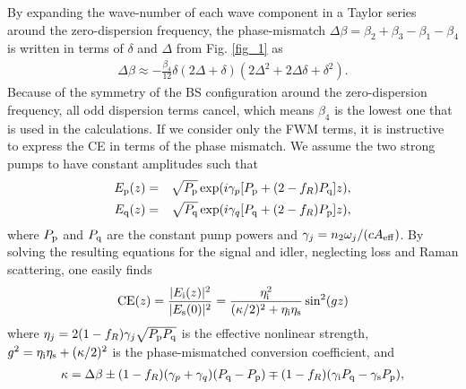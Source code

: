 \documentclass[10pt,letterpaper]{article}
\begin{document}
By expanding the wave-number of each wave component in a Taylor series around the zero-dispersion frequency, the phase-mismatch $\Delta \beta = \beta_2 + \beta_3 - \beta_1 - \beta_4$ is written in terms of $\delta$ and $\Delta$ from Fig. \ref{fig_1} as
\begin{eqnarray} \label{eq_22}
\Delta \beta \approx -\frac{\beta_4}{12}\delta (2\Delta + \delta)\left( 2\Delta^2+2\Delta \delta + \delta^2 \right).
\end{eqnarray}
Because of the symmetry of the BS configuration around the zero-dispersion frequency, all odd dispersion terms cancel, which means $\beta_4$ is the lowest one that is used in the calculations. If we consider only the FWM terms, it is instructive to express the CE in terms of the phase mismatch. We assume the two strong pumps to have constant amplitudes such that
\begin{eqnarray}\label{eq_3}
E_{\rm p}(z) &=& \sqrt{P_{\rm p}}\exp(i\gamma_p[P_{\rm p} + (2-f_R)P_{\rm q}]z),\\
E_{\rm q}(z) &=& \sqrt{P_{\rm q}}\exp(i\gamma_q[P_{\rm q} + (2-f_R)P_{\rm p}]z), \label{eq_4}
\end{eqnarray}
where $P_{\rm p}$ and $P_{\rm q}$ are the constant pump powers and $\gamma_j = n_2 \omega_j/(cA_{\rm eff})$. By solving the resulting equations for the signal and idler, neglecting loss and Raman scattering, one easily finds
\begin{eqnarray} \label{eq_23}
{\rm CE}(z) = \frac{|E_{\rm i}(z)|^2}{|E_{\rm s}(0)|^2} =  \frac{\eta_{\rm i}^2}{(\kappa/2)^2 + \eta_{\rm i}\eta_{\rm s}} \sin^2(gz)%
\end{eqnarray}
where $\eta_j = 2(1-f_R)\gamma_j \sqrt{P_{\rm p}P_{\rm q}}$ is the effective nonlinear strength, $g^2 = \eta_{\rm i}\eta_{\rm s} + (\kappa/2)^2$ is the phase-mismatched conversion coefficient, and 
\begin{align}
\kappa = \Delta \beta \pm (1-f_R)(\gamma_p + \gamma_q) (P_{\rm q}-  P_{\rm p}) \mp (1-f_R)(\gamma_{\rm i}P_{\rm q} - \gamma_{\rm s}P_{\rm p}), 
\end{align}
\end{document}

